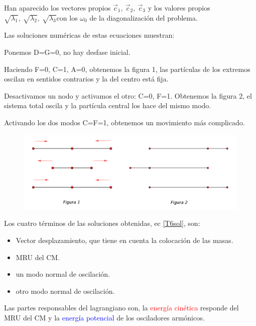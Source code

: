 Han aparecido los vectores propios $\vec c_1, \ \vec c_2, \ \vec c_3$ y los valores propios $\sqrt{\lambda_1},\ \sqrt{\lambda_2},\ \sqrt{\lambda_3}$con los $\omega_0$ de la diagonalización del problema.

Las soluciones numéricas de estas ecuaciones muestran:

Ponemos D=G=0, no hay desfase inicial.

Haciendo F=0, C=1, A=0, obtenemos la figura 1, las partículas de los extremos oscilan en sentidos contrarios y la del centro está fija.

Desactivamos un nodo y activamos el otro: C=0, F=1. Obtenemos la figura 2, el sistema total oscila y la partícula central los hace del mismo modo.

Activando los dos modos C=F=1, obtenemos un movimiento más complicado.

\vspace{5mm}
\begin{figure}[H]
		\centering
		\includegraphics[width=1\textwidth]{imagenes/img06-02.png}
	\end{figure}

Los cuatro términos de las soluciones obtenidas, ec \ref{T6sol}, son:

\begin{adjustwidth}{20pt}{20pt}
\begin{itemize}
\item Vector desplazamiento, que tiene en cuenta la colocación de las masas.
\vspace{-3mm} \item MRU del CM.
\vspace{-3mm} \item un modo normal de oscilación.
\vspace{-3mm} \item otro modo normal de oscilación.	
\end{itemize}
\end{adjustwidth}

Las partes responsables del lagrangiano son, la \textcolor{red}{energía cinética} responde del MRU del CM y la \textcolor{blue}{energía potencial} de los osciladores armónicos.

